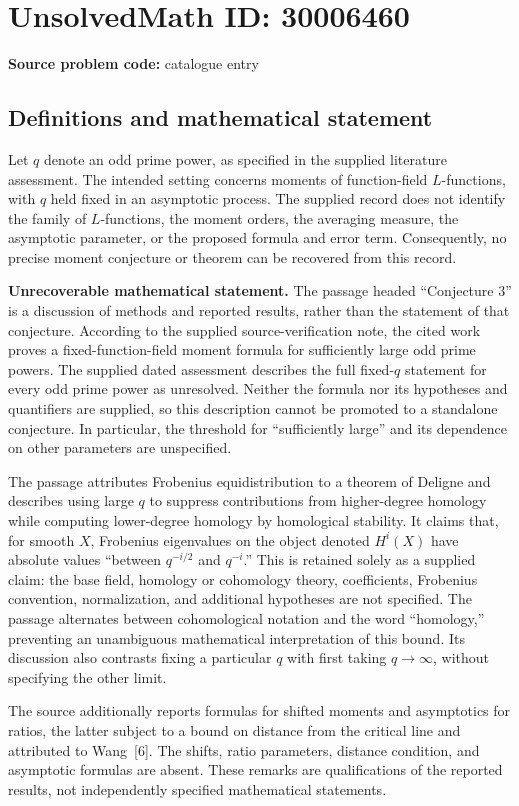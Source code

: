 \documentclass[11pt]{article}
\begin{document}
\section*{UnsolvedMath ID: 30006460}
\textbf{Source problem code:} catalogue entry
\subsection{Definitions and mathematical statement}
Let \(q\) denote an odd prime power, as specified in the supplied literature assessment. The intended setting concerns moments of function-field \(L\)-functions, with \(q\) held fixed in an asymptotic process. The supplied record does not identify the family of \(L\)-functions, the moment orders, the averaging measure, the asymptotic parameter, or the proposed formula and error term. Consequently, no precise moment conjecture or theorem can be recovered from this record.

\textbf{Unrecoverable mathematical statement.} The passage headed ``Conjecture 3'' is a discussion of methods and reported results, rather than the statement of that conjecture. According to the supplied source-verification note, the cited work proves a fixed-function-field moment formula for sufficiently large odd prime powers. The supplied dated assessment describes the full fixed-\(q\) statement for every odd prime power as unresolved. Neither the formula nor its hypotheses and quantifiers are supplied, so this description cannot be promoted to a standalone conjecture. In particular, the threshold for ``sufficiently large'' and its dependence on other parameters are unspecified.

The passage attributes Frobenius equidistribution to a theorem of Deligne and describes using large \(q\) to suppress contributions from higher-degree homology while computing lower-degree homology by homological stability. It claims that, for smooth \(X\), Frobenius eigenvalues on the object denoted \(H^i(X)\) have absolute values ``between \(q^{-i/2}\) and \(q^{-i}\).'' This is retained solely as a supplied claim: the base field, homology or cohomology theory, coefficients, Frobenius convention, normalization, and additional hypotheses are not specified. The passage alternates between cohomological notation and the word ``homology,'' preventing an unambiguous mathematical interpretation of this bound. Its discussion also contrasts fixing a particular \(q\) with first taking \(q\to\infty\), without specifying the other limit.

The source additionally reports formulas for shifted moments and asymptotics for ratios, the latter subject to a bound on distance from the critical line and attributed to Wang~[6]. The shifts, ratio parameters, distance condition, and asymptotic formulas are absent. These remarks are qualifications of the reported results, not independently specified mathematical statements.
\end{document}
